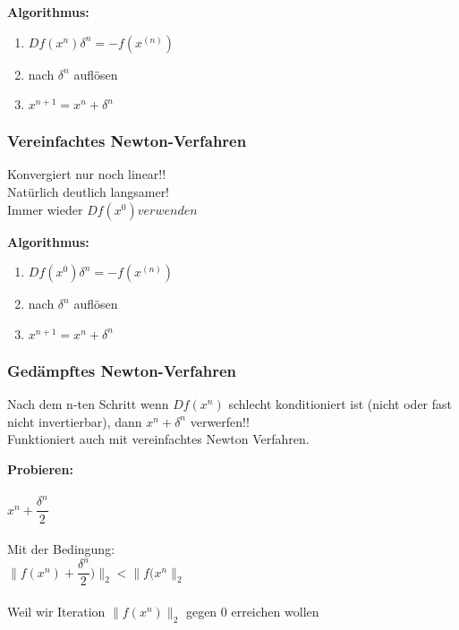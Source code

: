 \documentclass[../ZF_HM2.tex]{subfiles}
\begin{document}
\begin{mdframed}
	\textbf{Algorithmus:\\}
	\begin{enumerate}
		\item $Df(x^{n})\delta ^{n} = -f(x^{(n)})$
		\item nach $\delta ^{n}$ auflösen
		\item $x^{n+1} = x^{n} +\delta ^{n} $
	\end{enumerate}
\end{mdframed}

\subsubsection{Vereinfachtes Newton-Verfahren}
Konvergiert nur noch linear!!\\
Natürlich deutlich langsamer!\\

Immer wieder $Df(x^{0}) verwenden$

\begin{mdframed}
	\textbf{Algorithmus:\\}
	\begin{enumerate}
		\item $Df(x^{0})\delta ^{n} = -f(x^{(n)})$
		\item nach $\delta ^{n}$ auflösen
		\item $x^{n+1} = x^{n} +\delta ^{n} $
	\end{enumerate}
\end{mdframed}



\subsubsection{Gedämpftes Newton-Verfahren}

Nach dem n-ten Schritt wenn $Df(x^{n})$ schlecht konditioniert ist (nicht oder fast nicht invertierbar), dann $x^{n} +\delta ^{n}$ verwerfen!!\\
Funktioniert auch mit vereinfachtes Newton Verfahren.		

\begin{theorem}
	\textbf{Probieren:\\\\}
	$x^{n} + \dfrac{\delta ^{n}} {2}$\\\\
	Mit der Bedingung:\\
	$\|f(x^{n}) + \dfrac{\delta ^{n}} {2})\|_2 < \|f(x^{n} \|_2$ \\\\
	Weil wir Iteration $\|f(x^{n}) \|_2$ gegen 0 erreichen wollen
	 
\end{theorem}
\end{document}
